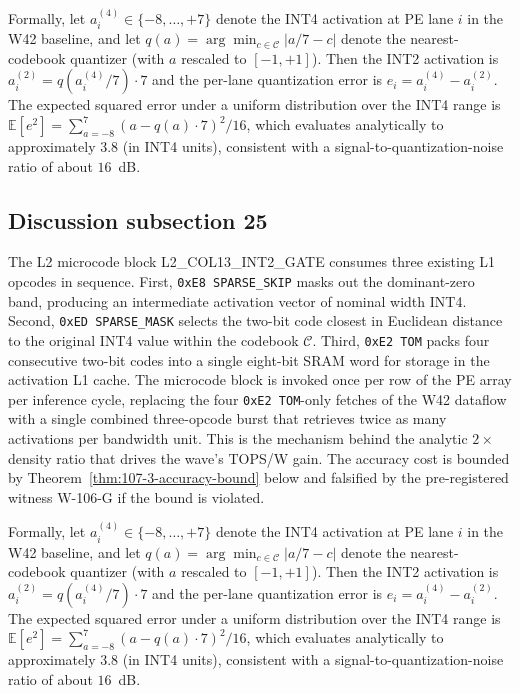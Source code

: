 Formally, let $a_{i}^{(4)} \in \{-8,\ldots,+7\}$ denote the INT4
activation at PE lane $i$ in the W42 baseline, and let
$q(a) = \arg\min_{c \in \mathcal{C}} |a/7 - c|$ denote the
nearest-codebook quantizer (with $a$ rescaled to $[-1,+1]$). Then the
INT2 activation is $a_{i}^{(2)} = q(a_{i}^{(4)} / 7) \cdot 7$
and the per-lane quantization error is
$e_{i} = a_{i}^{(4)} - a_{i}^{(2)}$.
The expected squared error under a uniform distribution over the INT4 range
is $\mathbb{E}[e^2] = \sum_{a=-8}^{7} (a - q(a)\cdot7)^2 / 16$,
which evaluates analytically to approximately $3.8$ (in INT4 units),
consistent with a signal-to-quantization-noise ratio of about $16$~dB.


\subsection{Discussion subsection 25}

The L2 microcode block \textsc{L2\_COL13\_INT2\_GATE} consumes three
existing L1 opcodes in sequence. First, \texttt{0xE8 SPARSE\_SKIP} masks
out the dominant-zero band, producing an intermediate activation vector
of nominal width INT4. Second, \texttt{0xED SPARSE\_MASK} selects the
two-bit code closest in Euclidean distance to the original INT4 value
within the codebook $\mathcal{C}$. Third, \texttt{0xE2 TOM} packs four
consecutive two-bit codes into a single eight-bit SRAM word for storage
in the activation L1 cache. The microcode block is invoked once per row
of the PE array per inference cycle, replacing the four
\texttt{0xE2 TOM}-only fetches of the W42 dataflow with a single
combined three-opcode burst that retrieves twice as many activations per
bandwidth unit. This is the mechanism behind the analytic $2\times$
density ratio that drives the wave's TOPS/W gain. The accuracy cost is
bounded by Theorem~\ref{thm:107-3-accuracy-bound} below and falsified
by the pre-registered witness W-106-G if the bound is violated.

Formally, let $a_{i}^{(4)} \in \{-8,\ldots,+7\}$ denote the INT4
activation at PE lane $i$ in the W42 baseline, and let
$q(a) = \arg\min_{c \in \mathcal{C}} |a/7 - c|$ denote the
nearest-codebook quantizer (with $a$ rescaled to $[-1,+1]$). Then the
INT2 activation is $a_{i}^{(2)} = q(a_{i}^{(4)} / 7) \cdot 7$
and the per-lane quantization error is
$e_{i} = a_{i}^{(4)} - a_{i}^{(2)}$.
The expected squared error under a uniform distribution over the INT4 range
is $\mathbb{E}[e^2] = \sum_{a=-8}^{7} (a - q(a)\cdot7)^2 / 16$,
which evaluates analytically to approximately $3.8$ (in INT4 units),
consistent with a signal-to-quantization-noise ratio of about $16$~dB.


